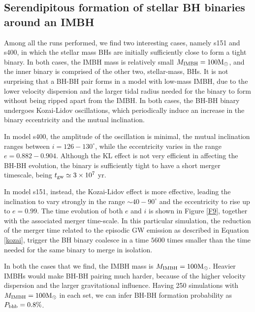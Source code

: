 \documentclass[useAMS,usenatbib]{mn2e}
\newcommand{\Ms}{{\rm M}_\odot}
\newcommand{\ibh}{{\rm IMBH}}
\begin{document}
\subsection{Serendipitous formation of stellar BH binaries around an IMBH}

Among all the runs performed, we find two interesting cases, namely s151 and s400, in which the stellar mass BHs are initially sufficiently close to form a tight binary. In both cases, the IMBH mass is relatively small $M_{\ibh} = 100\Ms$, and the inner binary is comprised of the other two, stellar-mass, BHs. It is not surprising that a BH-BH pair forms in a model with low-mass IMBH, due to the lower velocity dispersion and the larger tidal radius needed for the binary to form without being ripped apart from the IMBH. In both cases, the BH-BH binary undergoes Kozai-Lidov oscillations, which periodically induce an increase in the binary eccentricity and the mutual inclination.

In model s400, the amplitude of the oscillation is minimal, the mutual inclination ranges between $i = 126-130^\circ$, while the eccentricity varies in the range $e = 0.882-0.904$. Although the KL effect is not very efficient in affecting the BH-BH evolution, the binary is sufficiently tight to have a short merger timescale, being $t_{\rm gw} \simeq 3\times 10^7$ yr.

In model s151, instead, the Kozai-Lidov effect is more effective, leading the inclination to vary strongly in the range $\sim 40-90^\circ$ and the eccentricity to rise up to $e = 0.99$. The time evolution of both $e$ and $i$ is shown in Figure \ref{F9}, together with the associated merger time-scale. 
In this particular simulation, the reduction of the merger time related to the episodic GW emission as described in Equation \ref{kozai}, trigger the BH binary coalesce in a time $5600$ times smaller than the time needed for the same binary to merge in isolation.

In both the cases that we find, the IMBH mass is $M_\ibh=100\Ms$. Heavier IMBHs would make BH-BH pairing much harder, because of the higher velocity dispersion and the larger gravitational influence. Having 250 simulations with $M_\ibh=100\Ms$ in each set, we can infer BH-BH formation probability as $P_{\rm bhb} = 0.8\%$.
\end{document}
